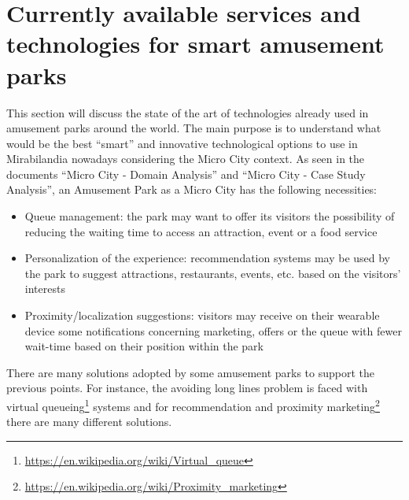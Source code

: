 

\section{Currently available services and technologies for smart amusement parks}\label{sec:state-of-the-art-analysis}
This section will discuss the state of the art of technologies already used in amusement parks around the world.
The main purpose is to understand what would be the best ``smart'' and innovative technological options to use in Mirabilandia nowadays considering the Micro City context.
As seen in the documents ``Micro City - Domain Analysis'' and ``Micro City - Case Study Analysis'', an Amusement Park as a Micro City has the following necessities:
\begin{itemize}
	\item Queue management: the park may want to offer its visitors the possibility of reducing the waiting time to access an attraction, event or a food service
	\item Personalization of the experience: recommendation systems may be used by the park to suggest attractions, restaurants, events, etc.
	      based on the visitors' interests
	\item Proximity/localization suggestions: visitors may receive on their wearable device some notifications concerning marketing, offers or the queue with fewer wait-time based on their position within the park
\end{itemize}

There are many solutions adopted by some amusement parks to support the previous points.
For instance, the avoiding long lines problem is faced with virtual queueing\footnote{\url{https://en.wikipedia.org/wiki/Virtual_queue}} systems
and for recommendation and proximity marketing\footnote{\url{https://en.wikipedia.org/wiki/Proximity_marketing}} there are many different solutions.

